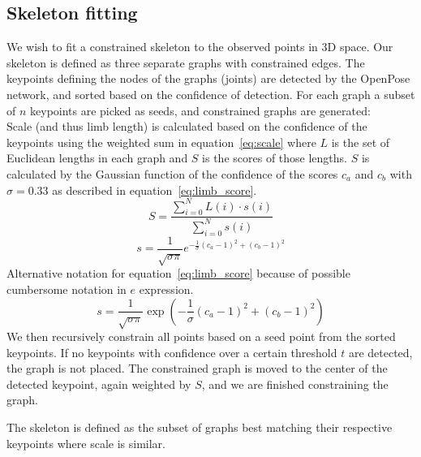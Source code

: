 \subsection{Skeleton fitting}

We wish to fit a constrained skeleton to the observed points in 3D space. Our skeleton is defined as three separate graphs with constrained edges.
The keypoints defining the nodes of the graphs (joints) are detected by the OpenPose network, and sorted based on the confidence of detection. For each graph a subset of $n$ keypoints are picked as seeds, and constrained graphs are generated:\\
Scale (and thus limb length) is calculated based on the confidence of the keypoints using the weighted sum in equation~\ref{eq:scale} where $L$ is the set of Euclidean lengths in each graph and $S$ is the scores of those lengths. $S$ is calculated by the Gaussian function of the confidence of the scores $c_a$ and $c_b$ with $\sigma = 0.33$ as described in equation~\ref{eq:limb_score}.
\begin{equation}
  S = \frac{\sum_{i=0}^{N}L(i) \cdot s(i)}{\sum_{i=0}^{N}s(i)}
  \label{eq:scale}
\end{equation}
\begin{equation}
  s = \frac{1}{\sqrt{\sigma\pi}}e^{-\frac{1}{\sigma}(c_a-1)^2 + (c_b -1)^2}
  \label{eq:limb_score}
\end{equation}
    {\color{red} Alternative notation for equation~\ref{eq:limb_score} because of possible cumbersome notation in $e$ expression.
\[
s = \frac{1}{\sqrt{\sigma\pi}}{\exp}\left(-\frac{1}{\sigma}(c_a-1)^2 + (c_b -1)^2\right)
\]}
We then recursively constrain all points based on a seed point from the sorted keypoints. If no keypoints with confidence over a certain threshold $t$ are detected, the graph is not placed.
The constrained graph is moved to the center of the detected keypoint, again weighted by $S$, and we are finished constraining the graph.

The skeleton is defined as the subset of graphs best matching their respective keypoints where scale is similar.




